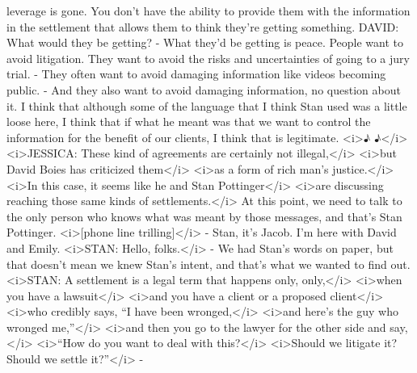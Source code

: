\begin{itemize}
\begin{itemize}
    leverage is gone. You don't have the ability to provide them with
    the information in the settlement that allows them to think they're
    getting something. DAVID: What would they be getting? - What they'd
    be getting is peace. People want to avoid litigation. They want to
    avoid the risks and uncertainties of going to a jury trial. - They
    often want to avoid damaging information like videos becoming
    public. - And they also want to avoid damaging information, no
    question about it. I think that although some of the language that I
    think Stan used was a little loose here, I think that if what he
    meant was that we want to control the information for the benefit of
    our clients, I think that is legitimate. \textless{}i\textgreater{}♪
    ♪\textless{}/i\textgreater{} \textless{}i\textgreater{}JESSICA:
    These kind of agreements are certainly not
    illegal,\textless{}/i\textgreater{} \textless{}i\textgreater{}but
    David Boies has criticized them\textless{}/i\textgreater{}
    \textless{}i\textgreater{}as a form of rich man's
    justice.\textless{}/i\textgreater{} \textless{}i\textgreater{}In
    this case, it seems like he and Stan
    Pottinger\textless{}/i\textgreater{} \textless{}i\textgreater{}are
    discussing reaching those same kinds of
    settlements.\textless{}/i\textgreater{} At this point, we need to
    talk to the only person who knows what was meant by those messages,
    and that's Stan Pottinger. \textless{}i\textgreater{}{[}phone line
    trilling{]}\textless{}/i\textgreater{} - Stan, it's Jacob. I'm here
    with David and Emily. \textless{}i\textgreater{}STAN: Hello,
    folks.\textless{}/i\textgreater{} - We had Stan's words on paper,
    but that doesn't mean we knew Stan's intent, and that's what we
    wanted to find out. \textless{}i\textgreater{}STAN: A settlement is
    a legal term that happens only, only,\textless{}/i\textgreater{}
    \textless{}i\textgreater{}when you have a
    lawsuit\textless{}/i\textgreater{} \textless{}i\textgreater{}and you
    have a client or a proposed client\textless{}/i\textgreater{}
    \textless{}i\textgreater{}who credibly says, ``I have been
    wronged,\textless{}/i\textgreater{} \textless{}i\textgreater{}and
    here's the guy who wronged me,''\textless{}/i\textgreater{}
    \textless{}i\textgreater{}and then you go to the lawyer for the
    other side and say,\textless{}/i\textgreater{}
    \textless{}i\textgreater{}``How do you want to deal with
    this?\textless{}/i\textgreater{} \textless{}i\textgreater{}Should we
    litigate it? Should we settle it?''\textless{}/i\textgreater{} -

\end{itemize}
\end{itemize}
